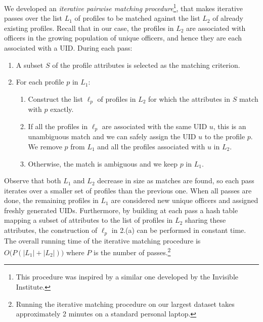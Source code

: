 We developed an \emph{iterative pairwise matching procedure}\footnote{This
procedure was inspired by a similar one developed by the Invisible Institute.},
that makes iterative passes over the list $L_1$ of profiles to be matched
against the list $L_2$ of already existing profiles. Recall that in our case,
the profiles in $L_2$ are associated with officers in the growing population of
unique officers, and hence they are each associated with a UID. During each
pass:
\begin{enumerate}
	\item A subset $S$ of the profile attributes is selected as the matching
		criterion.
	\item For each profile $p$ in $L_1$:
		\begin{enumerate}
			\item Construct the list $\ell_p$ of profiles in $L_2$ for which
				the attributes in $S$ match with $p$ exactly.
			\item If all the profiles in $\ell_p$ are associated with the same
				UID $u$, this is an unambiguous match and we can safely assign
				the UID $u$ to the profile $p$. We remove $p$ from $L_1$ and
				all the profiles associated with $u$ in $L_2$.
			\item Otherwise, the match is ambiguous and we keep $p$ in
				$L_1$.
		\end{enumerate}
\end{enumerate}
Observe that both $L_1$ and $L_2$ decrease in size as matches are found, so
each pass iterates over a smaller set of profiles than the previous one. When
all passes are done, the remaining profiles in $L_1$ are considered new
unique officers and assigned freshly generated UIDs. Furthermore, by
building at each pass a hash table mapping a subset of attributes to the
list of profiles in $L_2$ sharing these attributes, the construction of
$\ell_p$ in 2.(a) can be performed in constant time. The overall running time of the
  iterative matching procedure is $O\big(P(|L_1|+|L_2|)\big)$ where $P$ is the
  number of passes.\footnote{Running the iterative matching procedure on our
  largest dataset takes approximately 2 minutes on a standard personal laptop.}

